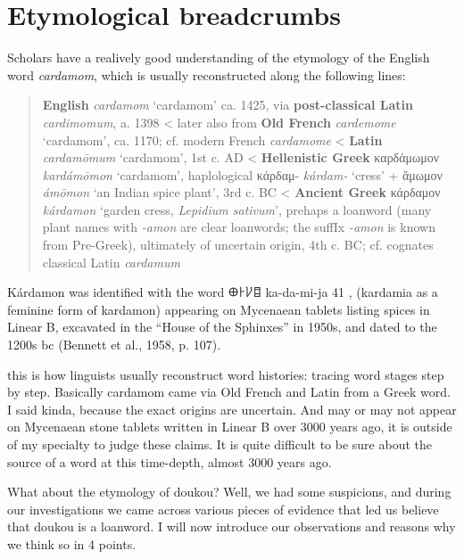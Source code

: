 \documentclass[12pt]{article}
\begin{document}
\section{Etymological breadcrumbs}

Scholars have a realively good understanding of the etymology of the English word \textit{cardamom}, which is usually reconstructed along the following lines:

\begin{quote}
    \textbf{English} \textit{cardamom} `cardamom' ca. 1425, via \textbf{post-classical Latin} \textit{cardimomum}, a. 1398
    < later also from \textbf{Old French} \textit{cardemome} `cardamom', ca. 1170; cf. modern French \textit{cardamome}
    < \textbf{Latin} \textit{cardamōmum} `cardamom', 1st c. AD
    < \textbf{Hellenistic Greek} {καρδάμωμον} \textit{kardámōmon} `cardamom', haplological κάρδαμ- \textit{kárdam-} `cress' + ἄμωμον \textit{ámōmon} `an Indian spice plant', 3rd c. BC
    < \textbf{Ancient Greek} {κάρδαμον} \textit{kárdamon} `garden cress, \textit{Lepidium sativum}', prehaps a loanword (many plant names with \textit{-amon} are clear loanwords; the suffIx \textit{-amon} is known from Pre-Greek), ultimately of uncertain origin, 4th c. BC; cf. cognates classical Latin \textit{cardamum}
    \parencites[s.v. cardamom]{oed}[s.v. cardamome]{tlfi}[s.v. cardamomum]{lewis_1879_latin}[s.v. καρδάμωμον]{liddell_1940_greekenglish}[s.v. κάρδαμον]{liddell_1940_greekenglish}[644]{beekes_2010_etymological}
\end{quote}

Kárdamon was identified with the word 𐀏𐀅𐀖𐀊 ka-da-mi-ja 41 , (kardamia as a feminine form of kardamon) appearing on Mycenaean tablets listing spices in Linear B, excavated in the “House of the Sphinxes” in 1950s, and dated to the 1200s bc (Bennett et al., 1958, p. 107).



this is how linguists usually reconstruct word histories: tracing word stages step by step. Basically cardamom came via Old French and Latin from a Greek word. I said kinda, because the exact origins are uncertain. And may or may not appear on Mycenaean stone tablets written in Linear B over 3000 years ago, it is outside of my specialty to judge these claims. It is quite difficult to be sure about the source of a word at this time-depth, almost 3000 years ago.

What about the etymology of doukou? Well, we had some suspicions, and during our investigations we came across various pieces of evidence that led us believe that doukou is a loanword. I will now introduce our observations and reasons why we think so in 4 points.
\end{document}
